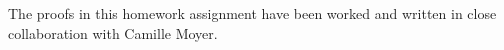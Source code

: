 The proofs in this homework assignment have been worked and written in close collaboration with Camille Moyer.